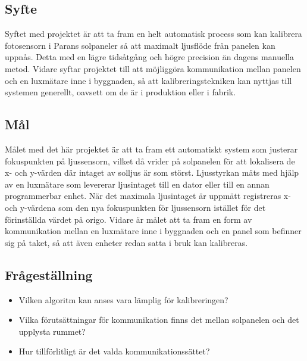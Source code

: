     \subsection{Syfte} %
    \label{sub:syfte}
          Syftet med projektet är att ta fram en helt automatisk process som kan kalibrera fotosensorn i Parans solpaneler så att maximalt ljusflöde från panelen kan uppnås. Detta med en lägre tidsåtgång och högre precision än dagens manuella metod. 
          Vidare syftar projektet till att möjliggöra kommunikation mellan panelen och en luxmätare inne i byggnaden, så att kalibreringstekniken kan nyttjas till systemen generellt, oavsett om de är i produktion eller i fabrik.

    \subsection{Mål} %
    \label{sub:mal}
        Målet med det här projektet är att ta fram ett automatiskt system som justerar fokuspunkten på ljussensorn, vilket då vrider på solpanelen för att lokalisera de x- och y-värden där intaget av solljus är som störst. 
        Ljusstyrkan mäts med hjälp av en luxmätare som levererar ljusintaget till en dator eller till en annan programmerbar enhet. 
        När det maximala ljusintaget är uppmätt registreras x- och y-värdena som den nya fokuspunkten för ljussensorn istället för det förinställda värdet på origo. 
        Vidare är målet att ta fram en form av kommunikation mellan en luxmätare inne i byggnaden och en panel som befinner sig på taket, så att även enheter redan satta i bruk kan kalibreras. 


    \subsection{Frågeställning} %
    \label{sub:fragestallning}
        \begin{itemize}
            \item Vilken algoritm kan anses vara lämplig för kalibreringen?\\
            \item Vilka förutsättningar för kommunikation finns det mellan solpanelen och det upplysta rummet? \\
            \item Hur tillförlitligt är det valda kommunikationssättet? \\
            
        \end{itemize}

